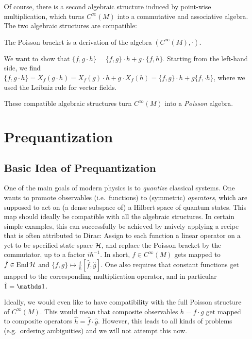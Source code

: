 \documentclass[parskip=half]{scrartcl}
\begin{document}
Of course, there is a second algebraic structure induced by point-wise multiplication, which turns $C^\infty(M)$ into a commutative and associative algebra. The two algebraic structures are compatible:

\begin{prop}
	The Poisson bracket is a derivation of the algebra $(C^\infty(M),\cdot)$.
\end{prop}
\begin{myproof}
	We want to show that $\{f,g\cdot h\}=\{f,g\}\cdot h + g\cdot \{f,h\}$. Starting from the left-hand side, we find $\{f,g\cdot h\}=X_f(g\cdot h)=X_f(g)\cdot h +g \cdot X_f(h)=\{f,g\}\cdot h+g\{f,\cdot h\}$, where we used the Leibniz rule for vector fields.
\end{myproof}

These compatible algebraic structures turn $C^\infty(M)$ into a \emph{Poisson} algebra.

\section{Prequantization}

\subsection{Basic Idea of Prequantization}

One of the main goals of modern physics is to \emph{quantize} classical systems. One wants to promote observables (i.e.~functions) to (symmetric) \emph{operators}, which are supposed to act on (a dense subspace of) a Hilbert space of quantum states. This map should ideally be compatible with all the algebraic structures. In certain simple examples, this can successfully be achieved by naively applying a recipe that is often attributed to Dirac: Assign to each function a linear operator on a yet-to-be-specified state space $\mathcal{H}$, and replace the Poisson bracket by the commutator, up to a factor $i\hbar^{-1}$. In short, $f\in C^\infty(M)$ gets mapped to $\hat f\in \operatorname{End} \mathcal{H}$ and $\{f,g\}\mapsto \frac{i}{\hbar}[\hat f,\hat g]$. One also requires that constant functions get mapped to the corresponding multiplication operator, and in particular $\hat 1=\Unit$.

Ideally, we would even like to have compatibility with the full Poisson structure of $C^\infty(M)$. This would mean that composite observables $h=f\cdot g$ get mapped to composite operators $\hat h=\hat f \cdot \hat g$. However, this leads to all kinds of problems (e.g.~ordering ambiguities) and we will not attempt this now.
\end{document}
